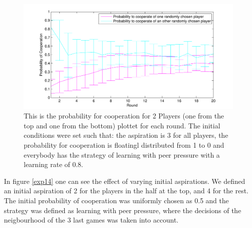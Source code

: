 \documentclass[11pt]{article}
\begin{document}
\begin{figure}
\centering
\includegraphics[scale=0.8]{ProbCoopwithtime20.pdf}
\caption[]{This is the probability for cooperation for 2 Players (one from the top and one from the bottom) plottet for each round. The initial conditions were set such that: the aspiration is 3 for all players, the probability for cooperation is floatingl distributed from 1 to 0 and everybody has the strategy of learning with peer pressure  with a learning rate of 0.8.}
\label{exp20time}
\end{figure}


In figure \ref{exp14} one can see the effect of varying initial aspirations. We defined an initial aspiration of 2 for the players in the half at the top, and 4 for the rest.
\\The initial probability of cooperation was uniformly chosen as 0.5 and the strategy was defined as learning with peer pressure, where the decisions of the neigbourhood of the 3 last games was taken into account.
\end{document}
